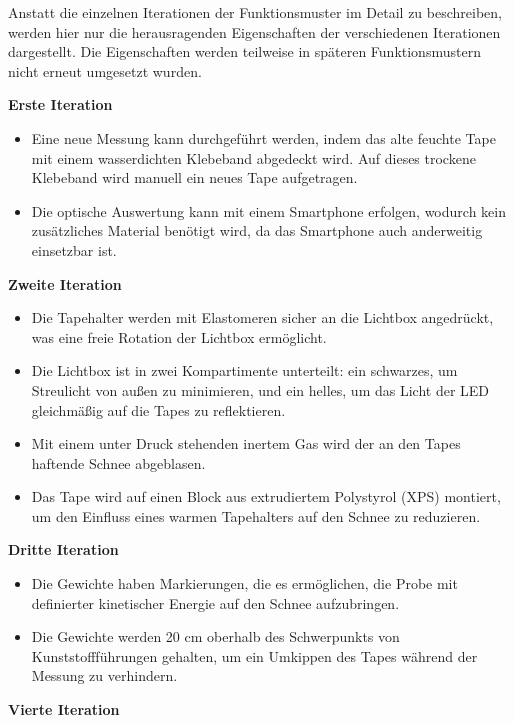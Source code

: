 Anstatt die einzelnen Iterationen der Funktionsmuster im Detail zu beschreiben, werden hier nur die herausragenden Eigenschaften der verschiedenen Iterationen dargestellt. Die Eigenschaften werden teilweise in späteren Funktionsmustern nicht erneut umgesetzt wurden.


\textbf{Erste Iteration}

\begin{itemize}
    \item Eine neue Messung kann durchgeführt werden, indem das alte feuchte Tape mit einem wasserdichten Klebeband abgedeckt wird. Auf dieses trockene Klebeband wird manuell ein neues Tape aufgetragen.
    \item Die optische Auswertung kann mit einem Smartphone erfolgen, wodurch kein zusätzliches Material benötigt wird, da das Smartphone auch anderweitig einsetzbar ist.
\end{itemize}

\textbf{Zweite Iteration}

\begin{itemize}
    \item Die Tapehalter werden mit Elastomeren sicher an die Lichtbox angedrückt, was eine freie Rotation der Lichtbox ermöglicht.
    \item Die Lichtbox ist in zwei Kompartimente unterteilt: ein schwarzes, um Streulicht von außen zu minimieren, und ein helles, um das Licht der LED gleichmäßig auf die Tapes zu reflektieren.
    \item Mit einem unter Druck stehenden inertem Gas wird der an den Tapes haftende Schnee abgeblasen.
    \item Das Tape wird auf einen Block aus extrudiertem Polystyrol (XPS) montiert, um den Einfluss eines warmen Tapehalters auf den Schnee zu reduzieren.
\end{itemize}

\textbf{Dritte Iteration}

\begin{itemize}
    \item Die Gewichte haben Markierungen, die es ermöglichen, die Probe mit definierter kinetischer Energie auf den Schnee aufzubringen.
    \item Die Gewichte werden 20 cm oberhalb des Schwerpunkts von Kunststoffführungen gehalten, um ein Umkippen des Tapes während der Messung zu verhindern.
\end{itemize}

\textbf{Vierte Iteration}

